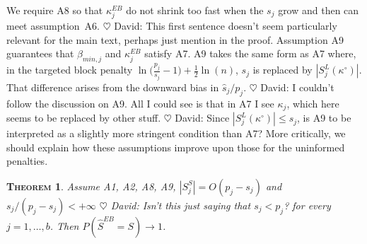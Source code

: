 \documentclass[aos]{imsart}
\theoremstyle{plain}
\newtheorem{thm}{\textsc{Theorem}}[section]
\newcommand{\david}[1]{{\small{\color{blue} \sf $\heartsuit$ David: #1}}}
\newcommand{\M}{\mathcal{M}}
\newcommand{\bs}{\boldsymbol}
\begin{document}
We require A8 so that $\kappa_j^{EB}$ do not shrink too fast when the $s_j$ grow and then can meet assumption~A6. \david{This first sentence doesn't seem particularly relevant for the main text, perhaps just mention in the proof.} Assumption A9 guarantees that $\beta_{min,j}$ and $\kappa_j^{EB}$ satisfy A7. A9 takes the same form as A7 where, in the targeted block penalty $\ln\big(\frac{p_j}{s_j}-1\big)+\tfrac 12\ln(n)$, $s_j$ is replaced by $|S^L_j(\kappa^{\circ})|$. That difference arises from the downward bias in $\widehat{s}_j/p_j$.
\david{I couldn't follow the discussion on A9. All I could see is that in A7 I see $\kappa_j$, which here seems to be replaced by other stuff.}
\david{Since $|S_j^L(\kappa^\circ)| \leq s_j$, is A9 to be interpreted as a slightly more stringent condition than A7? More critically, we should explain how these assumptions improve upon those for the uninformed penalties.} 
\begin{thm}\label{theo:empbayesselconsist}
    Assume A1, A2, A8, A9, $|S^S_j|=O(p_j-s_j)$ and $s_j / (p_j-s_j)<+\infty$ \david{Isn't this just saying that $s_j < p_j$?} for every $j=1,\ldots,b$. Then
$P(\hat{S}^{EB} = S) \to 1$.
\end{thm}


%    
\end{document}
